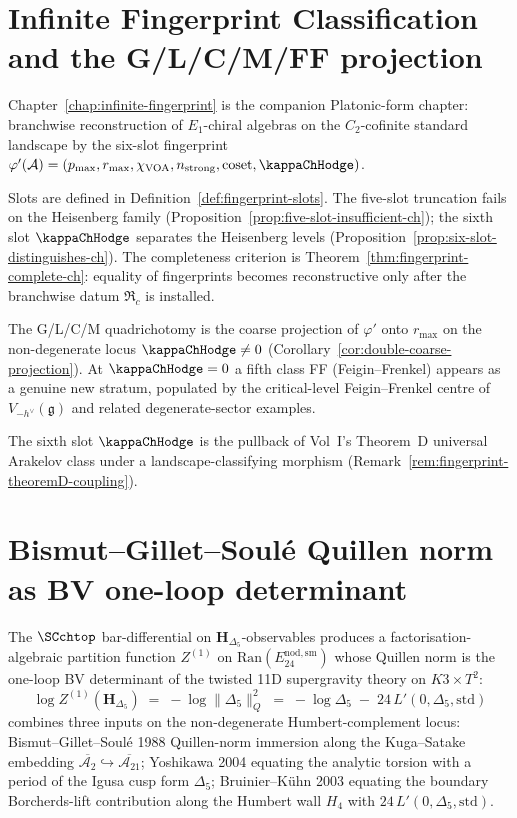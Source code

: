 \section{Infinite Fingerprint Classification and the G/L/C/M/FF projection}
\label{sec:part-viii-fingerprint}

Chapter~\ref{chap:infinite-fingerprint} is the companion Platonic-form
chapter: branchwise reconstruction of $E_{1}$-chiral algebras on the
$C_{2}$-cofinite standard landscape by the six-slot fingerprint
$\varphi'(\mathcal{A}) = (p_{\max}, r_{\max}, \chi_{\mathrm{VOA}},
n_{\mathrm{strong}}, \mathrm{coset}, \kappaChHodge)$.

Slots are defined in Definition~\ref{def:fingerprint-slots}. The
five-slot truncation fails on the Heisenberg family
(Proposition~\ref{prop:five-slot-insufficient-ch}); the sixth slot
$\kappaChHodge$ separates the Heisenberg levels
(Proposition~\ref{prop:six-slot-distinguishes-ch}). The completeness
criterion is Theorem~\ref{thm:fingerprint-complete-ch}: equality of
fingerprints becomes reconstructive only after the branchwise datum
\(\mathfrak R_c\) is installed.

The G/L/C/M quadrichotomy is the coarse projection of $\varphi'$ onto
$r_{\max}$ on the non-degenerate locus $\kappaChHodge \ne 0$
(Corollary~\ref{cor:double-coarse-projection}). At $\kappaChHodge = 0$
a fifth class FF (Feigin--Frenkel) appears as a genuine new stratum,
populated by the critical-level Feigin--Frenkel centre of
$V_{-h^{\vee}}(\mathfrak{g})$ and related degenerate-sector examples.

The sixth slot $\kappaChHodge$ is the pullback of Vol~I's Theorem~D
universal Arakelov class under a landscape-classifying morphism
(Remark~\ref{rem:fingerprint-theoremD-coupling}).

\section{Bismut--Gillet--Soulé Quillen norm as BV one-loop determinant}
\label{sec:part-viii-quillen-bv}

The $\SCchtop$ bar-differential on $\mathbf{H}_{\Delta_5}$-observables
produces a factorisation-algebraic partition function $Z^{(1)}$ on
$\mathrm{Ran}(E^{\mathrm{nod,sm}}_{24})$ whose Quillen norm is the
one-loop BV determinant of the twisted 11D supergravity theory on
$K3 \times T^2$:
\[
\log Z^{(1)}(\mathbf{H}_{\Delta_5})
\;=\;
-\log\|\Delta_5\|_Q^2
\;=\;
-\log\Delta_5
\;-\;
24\,L'(0,\Delta_5,\mathrm{std})
\]
combines three inputs on the non-degenerate Humbert-complement locus:
Bismut--Gillet--Soulé 1988 Quillen-norm immersion along the Kuga--Satake
embedding
$\overline{\mathcal{A}_2}\hookrightarrow\overline{\mathcal{A}_{21}}$;
Yoshikawa 2004 equating the analytic torsion with a period of the
Igusa cusp form $\Delta_5$; Bruinier--K\"uhn 2003 equating the boundary
Borcherds-lift contribution along the Humbert wall $H_4$ with
$24\,L'(0,\Delta_5,\mathrm{std})$.


